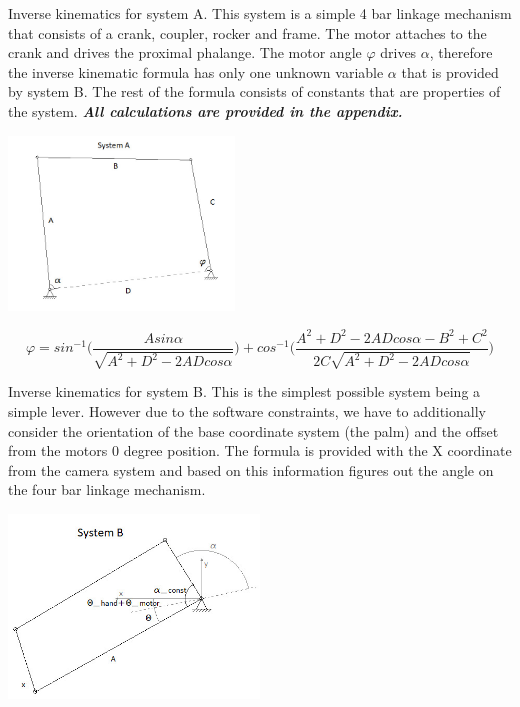 \documentclass{article}
\begin{document}
Inverse kinematics for system A. This system is a simple 4 bar linkage mechanism that consists of a crank, coupler, rocker and frame. The motor attaches to the crank and drives the proximal phalange. The motor angle $\varphi$ drives $\alpha$, therefore the inverse kinematic formula has only one unknown variable $\alpha$ that is provided by system B. The rest of the formula consists of constants that are properties of the system. \textbf{\textit{All calculations are provided in the appendix.}}

\begin{center}
\includegraphics[width=0.45\textwidth]{IMG/IK_02.jpeg}
\end{center}

\[ \varphi = sin^{-1} \bigg(\frac{Asin\alpha}{\sqrt{A^2+D^2-2ADcos\alpha}}\bigg) + cos^{-1} \bigg(\frac{A^2+D^2-2ADcos\alpha-B^2+C^2}{2C\sqrt{A^2+D^2-2ADcos\alpha}}\bigg)\]

Inverse kinematics for system B. This is the simplest possible system being a simple lever. However due to the software constraints, we have to additionally consider the orientation of the base coordinate system (the palm) and the offset from the motors 0 degree position. The formula is provided with the X coordinate from the camera system and based on this information figures out the angle on the four bar linkage mechanism.

\begin{center}
\includegraphics[width=0.5\textwidth]{IMG/IK_03.jpeg}
\end{center}
\end{document}
